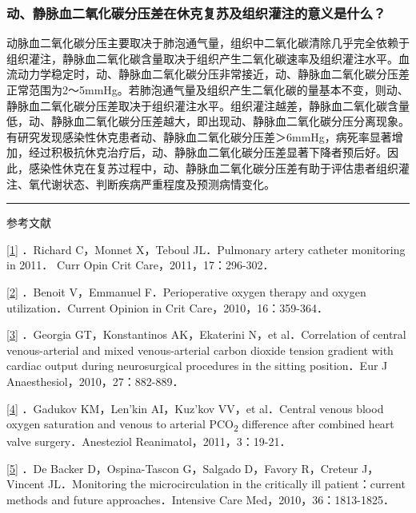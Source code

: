 \subsubsection{动、静脉血二氧化碳分压差在休克复苏及组织灌注的意义是什么？}

动脉血二氧化碳分压主要取决于肺泡通气量，组织中二氧化碳清除几乎完全依赖于组织灌注，静脉血二氧化碳含量取决于组织产生二氧化碳速率及组织灌注水平。血流动力学稳定时，动、静脉血二氧化碳分压非常接近，动、静脉血二氧化碳分压差正常范围为2～5mmHg。若肺泡通气量及组织产生二氧化碳的量基本不变，则动、静脉血二氧化碳分压差取决于组织灌注水平。组织灌注越差，静脉血二氧化碳含量低，动、静脉血二氧化碳分压差越大，即出现动、静脉血二氧化碳分压分离现象。有研究发现感染性休克患者动、静脉血二氧化碳分压差＞6mmHg，病死率显著增加，经过积极抗休克治疗后，动、静脉血二氧化碳分压差显著下降者预后好。因此，感染性休克在复苏过程中，动、静脉血二氧化碳分压差有助于评估患者组织灌注、氧代谢状态、判断疾病严重程度及预测病情变化。

\begin{center}\rule{0.5\linewidth}{\linethickness}\end{center}

参考文献

\protect\hyperlink{text00010.htmlux5cux23ch1-9-back}{{[}1{]}} ．Richard
C，Monnet X，Teboul JL．Pulmonary artery catheter monitoring in 2011．
Curr Opin Crit Care，2011，17：296-302．

\protect\hyperlink{text00010.htmlux5cux23ch2-9-back}{{[}2{]}} ．Benoit
V，Emmanuel F．Perioperative oxygen therapy and oxygen
utilization．Current Opinion in Crit Care，2010，16：359-364．

\protect\hyperlink{text00010.htmlux5cux23ch3-9-back}{{[}3{]}} ．Georgia
GT，Konstantinos AK，Ekaterini N，et al．Correlation of central
venous-arterial and mixed venous-arterial carbon dioxide tension
gradient with cardiac output during neurosurgical procedures in the
sitting position．Eur J Anaesthesiol，2010，27：882-889．

\protect\hyperlink{text00010.htmlux5cux23ch4-9-back}{{[}4{]}} ．Gadukov
KM，Len'kin AI，Kuz'kov VV，et al．Central venous blood oxygen
saturation and venous to arterial PCO\textsubscript{2} difference after
combined heart valve surgery．Anesteziol Reanimatol，2011，3：19-21．

\protect\hyperlink{text00010.htmlux5cux23ch5-9-back}{{[}5{]}} ．De
Backer D，Ospina-Tascon G，Salgado D，Favory R，Creteur J，Vincent
JL．Monitoring the microcirculation in the critically ill
patient：current methods and future approaches．Intensive Care
Med，2010，36：1813-1825．

